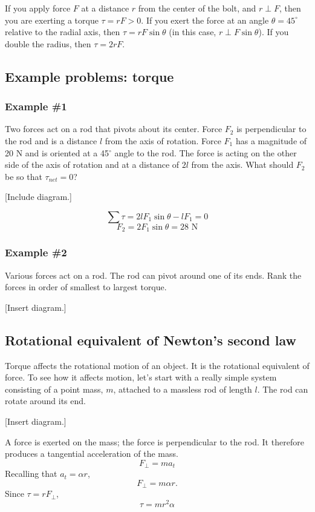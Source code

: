 If you apply force $F$ at a distance $r$ from the center of the bolt, and $r\perp F$, then you are exerting a torque $\tau=rF>0$.  If you exert the force at an angle $\theta=45^\circ$ relative to the radial axis, then $\tau=rF\sin\theta$ (in this case, $r\perp F\sin\theta$). If you double the radius, then $\tau=2rF$.

\subsection{Example problems: torque}
\subsubsection{Example \#1}
Two forces act on a rod that pivots about its center. Force $F_2$ is perpendicular to the rod and is a distance $l$ from the axis of rotation. Force $F_1$ has a magnitude of 20 N and is oriented at a 45$^\circ$ angle to the rod. The force is acting on the other side of the axis of rotation and at a distance of $2l$ from the axis. What should $F_2$ be so that $\tau_{net}=0$?

[Include diagram.]
\vspace{5cm}

$$\sum\tau=2lF_1\sin\theta-lF_1=0$$
$$F_2=2F_1\sin\theta=28\mbox{ N}$$

\subsubsection{Example \#2}
Various forces act on a rod. The rod can pivot around one of its ends. Rank the forces in order of smallest to largest torque.

[Insert diagram.]
\vspace{5cm}

\subsection{Rotational equivalent of Newton's second law}
Torque affects the rotational motion of an object. It is the rotational equivalent of force. To see how it affects motion, let's start with a really simple system consisting of a point mass, $m$, attached to a massless rod of length $l$. The rod can rotate around its end.

[Insert diagram.]
\vspace{5cm}

A force is exerted on the mass; the force is perpendicular to the rod. It therefore produces a tangential acceleration of the mass.
$$F_\perp=ma_t$$
Recalling that $a_t=\alpha r$,
$$F_\perp=m\alpha r.$$
Since $\tau=rF_\perp$,
$$\boxed{\tau = mr^2\alpha}$$

